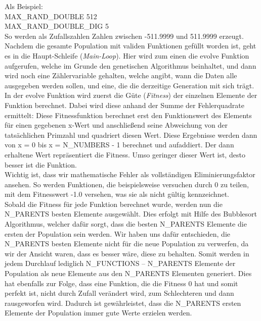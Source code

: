 \documentclass[a4paper,12pt]{article}
\begin{document}
\noindent Als Beispiel:\\
MAX\_RAND\_DOUBLE 512\\
MAX\_RAND\_DOUBLE\_DIG 5\\
So werden als Zufallszahlen Zahlen zwischen -511.9999 und 511.9999 erzeugt. \\

\noindent Nachdem die gesamte Population mit validen Funktionen gefüllt worden ist, geht es in die Haupt-Schleife (\emph{Main-Loop}). Hier wird zum einen die evolve Funktion aufgerufen, welche im Grunde den genetischen Algorithmus beinhaltet, und dann wird noch eine Zählervariable gehalten, welche angibt, wann die Daten alle ausgegeben werden sollen, und eine, die die derzeitige Generation mit sich trägt.\\

\noindent In der evolve Funktion wird zuerst die Güte (\emph{Fitness}) der einzelnen Elemente der Funktion berechnet. Dabei wird diese anhand der Summe der Fehlerquadrate ermittelt: Diese Fitnessfunktion berechnet erst den Funktionswert des Elements für einen gegebenen x-Wert und anschließend seine Abweichung von der tatsächlichen Primzahl und quadriert diesen Wert. Diese Ergebnisse werden dann von x = 0 bis x = N\_NUMBERS - 1 berechnet und aufaddiert. Der dann erhaltene Wert repräsentiert die Fitness. Umso geringer dieser Wert ist, desto besser ist die Funktion.\\ \noindent Wichtig ist, dass wir mathematische Fehler als vollständigen Eliminierungsfaktor ansehen. So werden Funktionen, die beispielsweise versuchen durch 0 zu teilen, mit dem Fitnesswert -1.0 versehen, was sie als nicht gültig kennzeichnet. \\

\noindent Sobald die Fitness für jede Funktion berechnet wurde, werden nun die \\N\_PARENTS besten Elemente ausgewählt. Dies erfolgt mit Hilfe des Bubblesort Algorithmus, welcher dafür sorgt, dass die besten N\_PARENTS Elemente die ersten der Population sein werden. 
Wir haben uns dafür entschieden, die N\_PARENTS besten Elemente nicht für die neue Population zu verwerfen, da wir der Ansicht waren, dass es besser wäre, diese zu behalten. Somit werden in jedem Durchlauf lediglich N\_FUNCTIONS – N\_PARENTS Elemente der Population als neue Elemente aus den N\_PARENTS Elementen generiert. Dies hat ebenfalls zur Folge, dass eine Funktion, die die Fitness 0 hat und somit perfekt ist, nicht durch Zufall verändert wird, zum Schlechteren und dann rausgeworfen wird. Dadurch ist gewährleistet, dass die N\_PARENTS ersten Elemente der Population immer gute Werte erzielen werden. 
\end{document}

